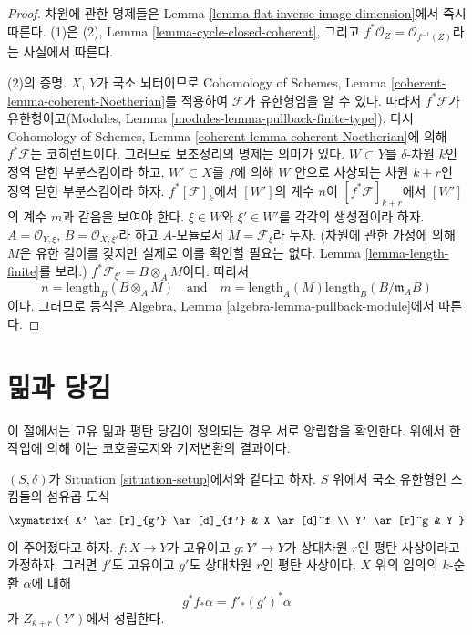 \begin{proof}
차원에 관한 명제들은 Lemma \ref{lemma-flat-inverse-image-dimension}에서
즉시 따른다. (1)은 (2), Lemma \ref{lemma-cycle-closed-coherent}, 그리고
$f^*\mathcal{O}_Z = \mathcal{O}_{f^{-1}(Z)}$라는 사실에서 따른다.

\medskip\noindent
(2)의 증명.
$X$, $Y$가 국소 뇌터이므로 Cohomology of Schemes, Lemma
\ref{coherent-lemma-coherent-Noetherian}를 적용하여 $\mathcal{F}$가
유한형임을 알 수 있다. 따라서 $f^*\mathcal{F}$가 유한형이고(Modules,
Lemma \ref{modules-lemma-pullback-finite-type}), 다시 Cohomology of Schemes,
Lemma \ref{coherent-lemma-coherent-Noetherian}에 의해
$f^*\mathcal{F}$는 코히런트이다. 그러므로 보조정리의 명제는 의미가
있다. $W \subset Y$를 $\delta$-차원 $k$인 정역 닫힌 부분스킴이라 하고,
$W' \subset X$를 $f$에 의해 $W$ 안으로 사상되는 차원 $k + r$인 정역
닫힌 부분스킴이라 하자. $f^*[{\mathcal F}]_k$에서 $[W']$의 계수 $n$이
$[f^*{\mathcal F}]_{k+r}$에서 $[W']$의 계수 $m$과 같음을 보여야 한다.
$\xi \in W$와 $\xi' \in W'$를 각각의 생성점이라 하자.
$A = \mathcal{O}_{Y, \xi}$, $B = \mathcal{O}_{X, \xi'}$라 하고
$A$-모듈로서 $M = \mathcal{F}_\xi$라 두자. (차원에 관한 가정에 의해
$M$은 유한 길이를 갖지만 실제로 이를 확인할 필요는 없다. Lemma
\ref{lemma-length-finite}를 보라.)
$f^*\mathcal{F}_{\xi'} = B \otimes_A M$이다. 따라서
$$
n = \text{length}_B(B \otimes_A M)
\quad
\text{and}
\quad
m = \text{length}_A(M) \text{length}_B(B/\mathfrak m_AB)
$$
이다. 그러므로 등식은 Algebra, Lemma
\ref{algebra-lemma-pullback-module}에서 따른다.
\end{proof}



\section{밂과 당김}
\label{section-push-pull}

\noindent
이 절에서는 고유 밂과 평탄 당김이 정의되는 경우 서로 양립함을 확인한다.
위에서 한 작업에 의해 이는 코호몰로지와 기저변환의 결과이다.

\begin{lemma}
\label{lemma-flat-pullback-proper-pushforward}
$(S, \delta)$가 Situation \ref{situation-setup}에서와 같다고 하자.
$S$ 위에서 국소 유한형인 스킴들의 섬유곱 도식
$$
\xymatrix{
X' \ar[r]_{g'} \ar[d]_{f'} & X \ar[d]^f \\
Y' \ar[r]^g & Y
}
$$
이 주어졌다고 하자. $f : X \to Y$가 고유이고 $g : Y' \to Y$가
상대차원 $r$인 평탄 사상이라고 가정하자. 그러면 $f'$도 고유이고
$g'$도 상대차원 $r$인 평탄 사상이다. $X$ 위의 임의의 $k$-순환
$\alpha$에 대해
$$
g^*f_*\alpha = f'_*(g')^*\alpha
$$
가 $Z_{k + r}(Y')$에서 성립한다.
\end{lemma}

